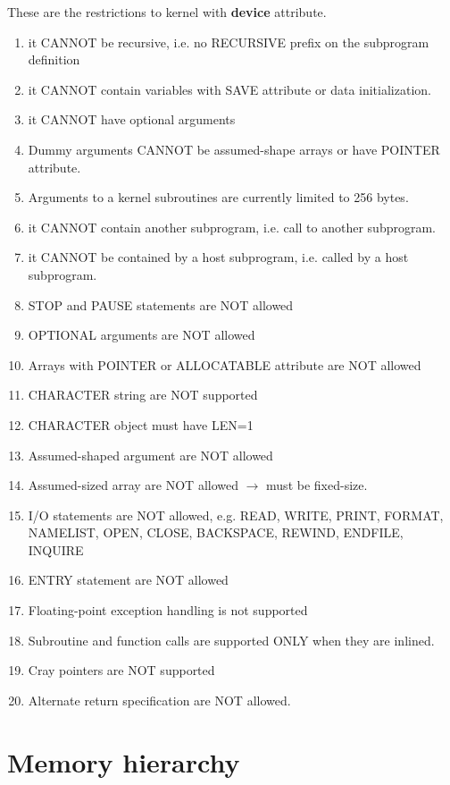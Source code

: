 These are the restrictions to kernel with {\bf device} attribute.
\begin{enumerate}
\item it  CANNOT be recursive, i.e. no RECURSIVE prefix on the
  subprogram definition
\item it CANNOT contain variables with SAVE attribute or data
  initialization.
\item it CANNOT have optional arguments
\item Dummy arguments CANNOT be assumed-shape arrays or have POINTER
  attribute.
\item Arguments to a kernel subroutines are currently limited to 256
  bytes. 
\item it CANNOT contain another subprogram, i.e. call to another
  subprogram.
\item it CANNOT be contained by a host subprogram, i.e.  called by a
  host subprogram.
\item STOP and PAUSE statements are NOT allowed
\item OPTIONAL arguments are NOT allowed
\item Arrays with POINTER or ALLOCATABLE attribute are NOT allowed
\item CHARACTER string are NOT supported
\item CHARACTER object must have LEN=1
\item Assumed-shaped argument are NOT allowed
\item Assumed-sized array are NOT allowed $\rightarrow$ must be
  fixed-size. 
\item I/O statements are NOT allowed, e.g. READ, WRITE, PRINT, FORMAT,
  NAMELIST, OPEN, CLOSE, BACKSPACE, REWIND, ENDFILE, INQUIRE
\item ENTRY statement are NOT allowed
\item Floating-point exception handling is not supported
\item Subroutine and function calls are supported ONLY when they are
  inlined. 
\item Cray pointers are NOT supported
\item Alternate return specification are NOT allowed.
\end{enumerate}

\section{Memory hierarchy}
\label{sec:memory-hierarchy}

